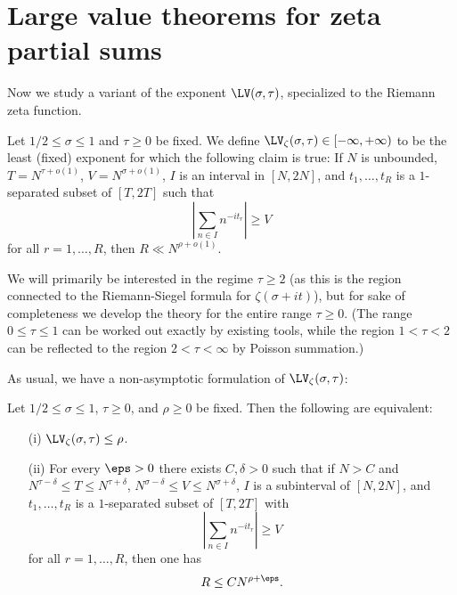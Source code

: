 \chapter{Large value theorems for zeta partial sums}

Now we study a variant of the exponent $\LV(\sigma,\tau)$, specialized to the Riemann zeta function.

\begin{definition}\label{lvz-def} Let $1/2 \leq \sigma \leq 1$ and $\tau \geq 0$ be fixed. We define $\LV_\zeta(\sigma,\tau) \in [-\infty, +\infty)$ to be the least (fixed) exponent for which the following claim is true: 
    If $N$ is unbounded, $T = N^{\tau+o(1)}$, $V = N^{\sigma+o(1)}$, $I$ is an interval in $[N,2N]$, and $t_1,\dots,t_R$ is a $1$-separated subset of $[T,2T]$ such that
    $$  |\sum_{n \in I} n^{-it_r}| \geq V$$
    for all $r=1,\dots,R$, then $R \ll N^{\rho+o(1)}$.
\end{definition}


We will primarily be interested in the regime $\tau \geq 2$ (as this is the region connected to the Riemann-Siegel formula for $\zeta(\sigma+it)$), but for sake of completeness we develop the theory for the entire range $\tau \geq 0$.  (The range $0 \leq \tau \leq 1$ can be worked out exactly by existing tools, while the region $1 < \tau < 2$ can be reflected to the region $2 < \tau < \infty$ by Poisson summation.)

As usual, we have a non-asymptotic formulation of $\LV_\zeta(\sigma,\tau)$:

\begin{lemma}\label{lvz-asymp} Let $1/2 \leq \sigma \leq 1$, $\tau \geq 0$, and $\rho \geq 0$  be fixed.  Then the following are equivalent:
    \begin{itemize}
    \item[(i)] $\LV_\zeta(\sigma,\tau) \leq \rho$.
    \item[(ii)] For every $\eps>0$ there exists $C,\delta>0$ such that if $N > C$ and $N^{\tau-\delta} \leq T \leq N^{\tau+\delta}$, $N^{\sigma-\delta} \leq V \leq N^{\sigma+\delta}$, $I$ is a subinterval of $[N,2N]$, and $t_1,\dots,t_R$ is a $1$-separated subset of $[T,2T]$ with
    $$ |\sum_{n \in I} n^{-it_r}| \geq V$$
    for all $r=1,\dots,R$, then one has
    $$ R \leq C N^{\rho+\eps}.$$
    \end{itemize}
\end{lemma}

